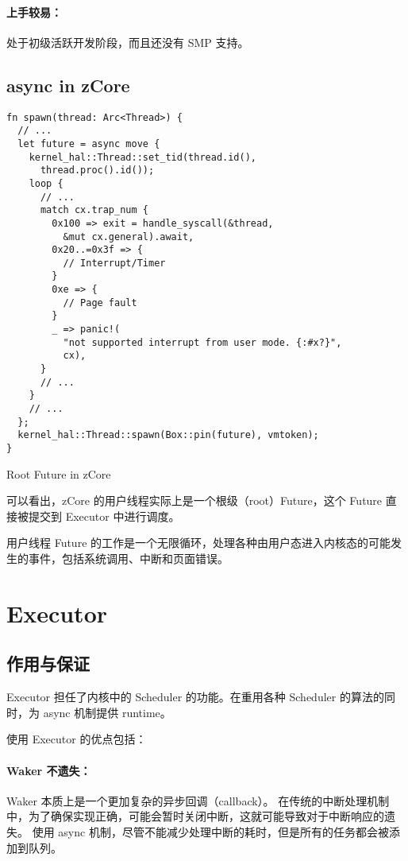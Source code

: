 \documentclass[UTF-8]{ctexart}
\begin{document}
\paragraph{上手较易：}处于初级活跃开发阶段，而且还没有 SMP 支持。

\subsection{async in zCore}

\begin{listing}[H]
    \begin{verbatim}
fn spawn(thread: Arc<Thread>) {
  // ...
  let future = async move {
    kernel_hal::Thread::set_tid(thread.id(),
      thread.proc().id());
    loop {
      // ...
      match cx.trap_num {
        0x100 => exit = handle_syscall(&thread,
          &mut cx.general).await,
        0x20..=0x3f => {
          // Interrupt/Timer
        }
        0xe => {
          // Page fault
        }
        _ => panic!(
          "not supported interrupt from user mode. {:#x?}",
          cx),
      }
      // ...
    }
    // ...
  };
  kernel_hal::Thread::spawn(Box::pin(future), vmtoken);
}
    \end{verbatim}
    \caption{Root Future in zCore}
    \label{src:zcore}
\end{listing}

可以看出，zCore 的用户线程实际上是一个根级（root）Future，这个 Future 直接被提交到 Executor 中进行调度。

用户线程 Future 的工作是一个无限循环，处理各种由用户态进入内核态的可能发生的事件，包括系统调用、中断和页面错误。

\section{Executor}
\label{sec:executor}
\subsection{作用与保证}
Executor 担任了内核中的 Scheduler 的功能。在重用各种 Scheduler 的算法的同时，为 async 机制提供 runtime。

使用 Executor 的优点包括：
\paragraph{Waker 不遗失：}Waker 本质上是一个更加复杂的异步回调（callback）。
在传统的中断处理机制中，为了确保实现正确，可能会暂时关闭中断，这就可能导致对于中断响应的遗失。
使用 async 机制，尽管不能减少处理中断的耗时，但是所有的任务都会被添加到队列。
\end{document}
